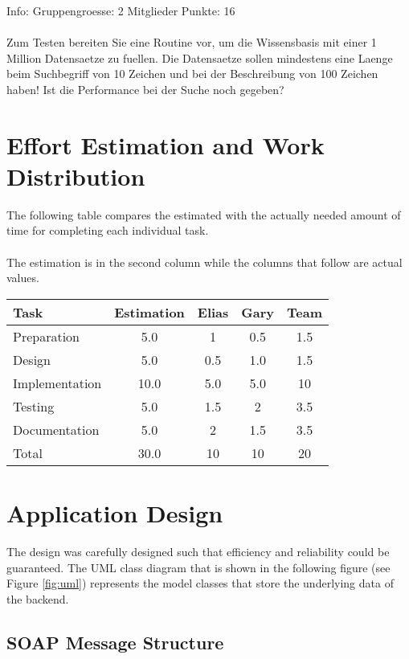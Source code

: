 \documentclass[11pt, a4paper]{article}
\begin{document}
Info: Gruppengroesse: 2 Mitglieder Punkte: 16
\\\\
Zum Testen bereiten Sie eine Routine vor, um die Wissensbasis mit einer 1
Million Datensaetze zu fuellen. Die Datensaetze sollen mindestens eine Laenge
beim Suchbegriff von 10 Zeichen und bei der Beschreibung von 100 Zeichen haben!
Ist die Performance bei der Suche noch gegeben?

\section{Effort Estimation and Work Distribution}

The following table compares the estimated with the actually needed
amount of time for completing each individual task.
\\\\
The estimation is in the second column while the columns that follow
are actual values.

\parskip 12pt
\begin{tabular} {| l | c | c | c | c |}
	\hline
	Task & Estimation & Elias & Gary & Team	\\ \hline \hline
	Preparation & 5.0 & 1 &  0.5 & 1.5		\\ \hline
	Design & 5.0  & 0.5 &	1.0  & 1.5			\\ \hline
	Implementation & 10.0 & 5.0 & 5.0 & 10 \\ \hline
	Testing & 5.0	& 1.5	& 2 & 3.5 \\ \hline
	Documentation	& 5.0 & 2 & 1.5 & 3.5	\\ \hline 
	Total	& 30.0	& 10 & 10 & 20 \\
	\hline
\end{tabular}

\section{Application Design}

The design was carefully designed such that efficiency and reliability could be
guaranteed. The UML class diagram that is shown in the following figure (see
Figure \ref{fig:uml}) represents the model classes that store the underlying
data of the backend. 


\subsection{SOAP Message Structure}
\end{document}
